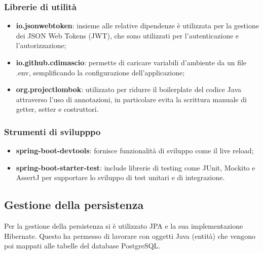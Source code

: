\subsubsection*{Librerie di utilità}
\begin{itemize}
    \item \textbf{io.jsonwebtoken}: insieme alle relative dipendenze è utilizzata per la gestione dei JSON Web Tokens (JWT), che sono utilizzati per l'autenticazione e l'autorizzazione;
    \item \textbf{io.github.cdimascio}: permette di caricare variabili d'ambiente da un file .env, semplificando la configurazione dell'applicazione;
    \item \textbf{org.projectlombok}: utilizzato per ridurre il boilerplate del codice Java attraverso l'uso di annotazioni, in particolare evita la scrittura manuale di getter, setter e costruttori.
\end{itemize}

\subsubsection*{Strumenti di svilupppo}
\begin{itemize}
    \item \textbf{spring-boot-devtools}: fornisce funzionalità di sviluppo come il live reload;
    \item \textbf{spring-boot-starter-test}: include librerie di testing come JUnit, Mockito e AssertJ per supportare lo sviluppo di test unitari e di integrazione.
\end{itemize}


\subsection{Gestione della persistenza}
Per la gestione della persistenza si è utilizzato JPA e la sua implementazione Hibernate.
Questo ha permesso di lavorare con oggetti Java (entità) che vengono poi mappati alle tabelle del database PostgreSQL.\\

